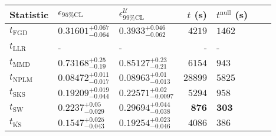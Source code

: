 \begin{tabular}{l|llr|llr}
	Statistic & $\epsilon_{95\%\mathrm{CL}}$ & $\epsilon^    {\mathcal{U}}_{99\%\mathrm{CL}}$ & $t$ (s) & $t^{\mathrm{null}}$ (s) \\
	\midrule
	$t_{\mathrm{FGD}}$ & $0.31601_{-0.064}^{+0.067}$ & $0.3933_{-0.062}^{+0.046}$ & $4219$ & $1462$ \\
	$t_{\mathrm{LLR}}$ & - & - & - & - \\
	$t_{\mathrm{MMD}}$ & $0.73168_{-0.19}^{+0.25}$ & $0.85127_{-0.21}^{+0.23}$ & $6154$ & $943$ \\
\rowcolor{red!35}	$t_{\mathrm{NPLM}}$ & $0.08472_{-0.017}^{+0.011}$ & $0.08963_{-0.013}^{+0.01}$ & $28899$ & $5825$ \\
	$t_{\mathrm{SKS}}$ & $0.19209_{-0.044}^{+0.019}$ & $0.22571_{-0.0097}^{+0.02}$ & $5294$ & $958$ \\
	$t_{\mathrm{SW}}$ & $0.2237_{-0.029}^{+0.05}$ & $0.29694_{-0.038}^{+0.044}$ & ${\mathbf{876}}$ & ${\mathbf{303}}$ \\
	$t_{\overline{\mathrm{KS}}}$ & ${\mathbf{0.1547_{-0.043}^{+0.025}}}$ & ${\mathbf{0.19254_{-0.046}^{+0.023}}}$ & $4086$ & $386$ \\
	\bottomrule
\end{tabular}